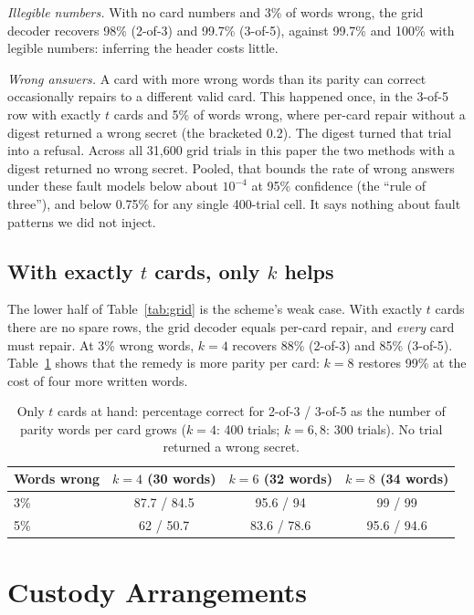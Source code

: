 \documentclass[numeric]{anvil-paper}
\begin{document}
\emph{Illegible numbers.} With no card numbers and 3\% of words wrong, the grid
decoder recovers 98\% (2-of-3) and 99.7\% (3-of-5), against 99.7\% and
100\% with legible numbers: inferring the header costs little.

\emph{Wrong answers.} A card with more wrong words than its parity can
correct occasionally repairs to a different valid card. This happened once,
in the 3-of-5 row with exactly $t$ cards and 5\% of words wrong, where per-card
repair without a digest returned a wrong secret (the bracketed 0.2). The digest
turned that trial into a refusal. Across all 31{,}600 grid trials in this paper the two
methods with a digest returned no wrong secret. Pooled, that bounds the rate of
wrong answers under these fault models below about $10^{-4}$ at 95\% confidence
(the ``rule of three''), and below 0.75\% for any single 400-trial cell. It says
nothing about fault patterns we did not inject.

\subsection{With exactly $t$ cards, only $k$ helps}

The lower half of Table~\ref{tab:grid} is the scheme's weak case. With exactly
$t$ cards there are no spare rows, the grid decoder equals per-card repair, and
\emph{every} card must repair. At 3\% wrong words, $k=4$ recovers 88\% (2-of-3)
and 85\% (3-of-5). Table~\ref{tab:k} shows that the remedy is more parity per
card: $k=8$ restores 99\% at the cost of four more written words.

\begin{table}[tb]
\centering
\caption{Only $t$ cards at hand: percentage correct for 2-of-3 / 3-of-5 as the
number of parity words per card grows ($k=4$: 400 trials; $k=6,8$: 300
trials). No trial returned a wrong secret.}
\label{tab:k}
\small
\begin{tabular}{lccc}
\toprule
Words wrong & $k=4$ (30 words) & $k=6$ (32 words) & $k=8$ (34 words) \\
\midrule
3\% & 87.7 / 84.5 & 95.6 / 94 & 99 / 99 \\
5\% & 62 / 50.7 & 83.6 / 78.6 & 95.6 / 94.6 \\
\bottomrule
\end{tabular}
\end{table}

\section{Custody Arrangements}
\label{sec:scenarios}
\end{document}
